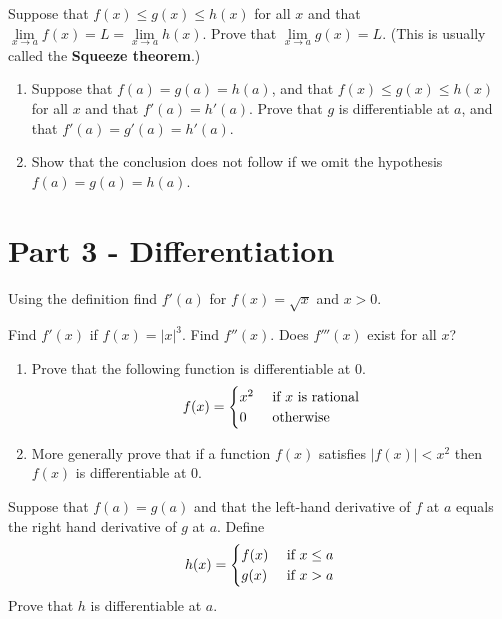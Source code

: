 \documentclass[9pt, a4paper, oneside]{amsart}
\begin{document}
\begin{questions}[resume]
		\item Suppose that $ f(x) \le g(x) \le h(x)$ for all $ x$ and that $ \lim \limits_{x \rightarrow a} f(x) = L = \lim \limits_{x \rightarrow a} h(x)$. Prove that $ \lim \limits_{x \rightarrow a} g(x) = L$. (This is usually called the \textbf{Squeeze theorem}.)

		\item
		\begin{enumerate}
			\item Suppose that $ f(a) = g(a) = h(a)$, and that $ f(x) \le g(x) \le h(x)$ for all $ x$ and that $ f'(a) = h'(a)$. Prove that $ g$ is differentiable at $ a$, and that $ f'(a) = g'(a) = h'(a)$.

			\item Show that the conclusion does not follow if we omit the hypothesis $ f(a) = g(a) = h(a)$.
		\end{enumerate}

	\end{questions}


	\newpage
	\section*{Part 3 - Differentiation}
	\begin{questions}[resume]

		\item Using the definition find $ f'(a)$ for $ f(x) = \sqrt{x}$ and $ x > 0$.

		\item Find $ f'(x)$ if $ f(x) = |x|^3$. Find $ f''(x)$. Does $ f'''(x)$ exist for all $ x$?

		\item
		\begin{enumerate}
			\item Prove that the following function is differentiable at $ 0$.
			      \begin{align*}
			      	f(x) = \begin{cases}
			      	x^2 & \mbox{ if $ x$ is rational} \\
			      	0   & \mbox{ otherwise }
			      	\end{cases}
			      \end{align*}

			\item More generally prove that if a function $ f(x)$ satisfies $ |f(x)| < x^2$  then $ f(x) $ is differentiable at $ 0$.
		\end{enumerate}

		\item Suppose that $ f(a) = g(a)$ and that the left-hand derivative of $ f$ at $ a$ equals the right hand derivative of $ g$ at $ a$. Define \begin{align*}
		h(x) = \begin{cases}
		f(x) & \mbox{ if $ x \le a$} \\
		g(x) & \mbox{ if $ x > a$}
		\end{cases}
		\end{align*}
		Prove that $ h$ is differentiable at $ a$.



	\end{questions}
\end{document}
